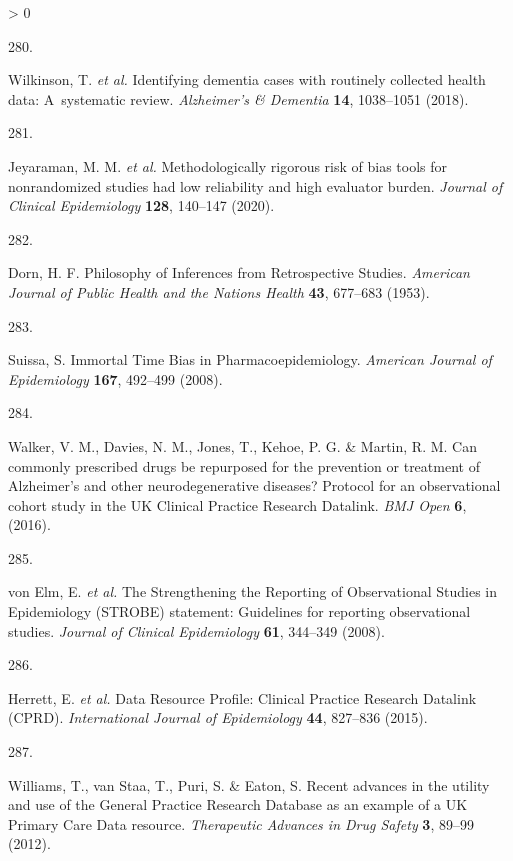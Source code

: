 \documentclass[a4paper, twoside]{templates/ociamthesis}
\newlength{\cslhangindent}
\newlength{\csllabelwidth}
\newenvironment{CSLReferences}[3] %
 {%
  \setlength{\parindent}{0pt}
  \ifodd #1 \everypar{\setlength{\hangindent}{\cslhangindent}}\ignorespaces\fi
  \ifnum #2 > 0
  \setlength{\parskip}{#2\baselineskip}
  \fi
 }%
 {}
\newcommand{\CSLLeftMargin}[1]{\parbox[t]{\maxof{\widthof{#1}}{\csllabelwidth}}{#1}}
\newcommand{\CSLRightInline}[1]{\parbox[t]{\linewidth - \csllabelwidth}{#1}}
\begin{document}
\begin{CSLReferences}{0}{0}
\leavevmode\hypertarget{ref-wilkinson2018}{}%
\CSLLeftMargin{280. }
\CSLRightInline{Wilkinson, T. \emph{et al.} Identifying dementia cases with routinely collected health data: A~systematic review. \emph{Alzheimer's \& Dementia} \textbf{14}, 1038--1051 (2018).}

\leavevmode\hypertarget{ref-jeyaraman2020}{}%
\CSLLeftMargin{281. }
\CSLRightInline{Jeyaraman, M. M. \emph{et al.} Methodologically rigorous risk of bias tools for nonrandomized studies had low reliability and high evaluator burden. \emph{Journal of Clinical Epidemiology} \textbf{128}, 140--147 (2020).}

\leavevmode\hypertarget{ref-dorn1953}{}%
\CSLLeftMargin{282. }
\CSLRightInline{Dorn, H. F. Philosophy of {Inferences} from {Retrospective Studies}. \emph{American Journal of Public Health and the Nations Health} \textbf{43}, 677--683 (1953).}

\leavevmode\hypertarget{ref-suissa2008}{}%
\CSLLeftMargin{283. }
\CSLRightInline{Suissa, S. Immortal {Time Bias} in {Pharmacoepidemiology}. \emph{American Journal of Epidemiology} \textbf{167}, 492--499 (2008).}

\leavevmode\hypertarget{ref-walker2016}{}%
\CSLLeftMargin{284. }
\CSLRightInline{Walker, V. M., Davies, N. M., Jones, T., Kehoe, P. G. \& Martin, R. M. Can commonly prescribed drugs be repurposed for the prevention or treatment of {Alzheimer}'s and other neurodegenerative diseases? Protocol for an observational cohort study in the {UK Clinical Practice Research Datalink}. \emph{BMJ Open} \textbf{6}, (2016).}

\leavevmode\hypertarget{ref-vonelm2008}{}%
\CSLLeftMargin{285. }
\CSLRightInline{von Elm, E. \emph{et al.} The {Strengthening} the {Reporting} of {Observational Studies} in {Epidemiology} ({STROBE}) statement: Guidelines for reporting observational studies. \emph{Journal of Clinical Epidemiology} \textbf{61}, 344--349 (2008).}

\leavevmode\hypertarget{ref-herrett2015}{}%
\CSLLeftMargin{286. }
\CSLRightInline{Herrett, E. \emph{et al.} Data {Resource Profile}: Clinical {Practice Research Datalink} ({CPRD}). \emph{International Journal of Epidemiology} \textbf{44}, 827--836 (2015).}

\leavevmode\hypertarget{ref-williams2012}{}%
\CSLLeftMargin{287. }
\CSLRightInline{Williams, T., van Staa, T., Puri, S. \& Eaton, S. Recent advances in the utility and use of the {General Practice Research Database} as an example of a {UK Primary Care Data} resource. \emph{Therapeutic Advances in Drug Safety} \textbf{3}, 89--99 (2012).}


\end{CSLReferences}
\end{document}
